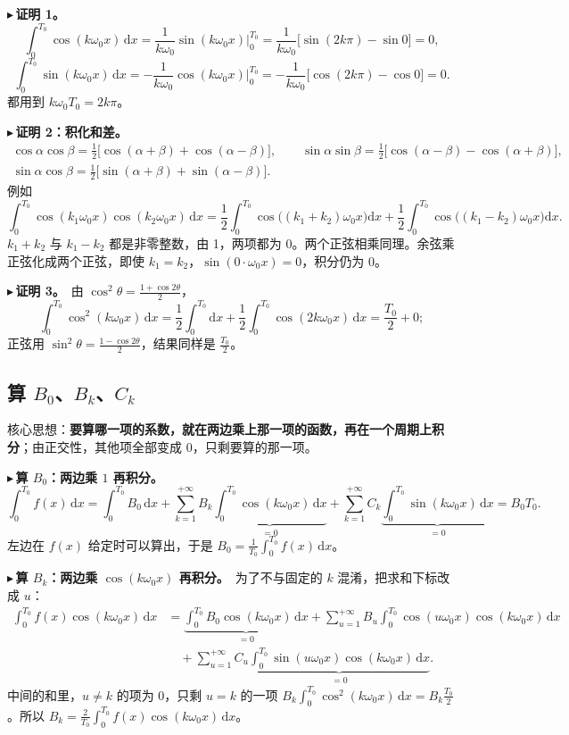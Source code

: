 \documentclass[UTF8,a4paper,11pt]{ctexart}
\newcounter{ex}[section]
\newcommand{\point}[1]{\par\addvspace{1ex}\noindent\textcolor{ptteal}{$\blacktriangleright$\,\textbf{#1}}\ }
\begin{document}
\point{证明 1。}
\[
\int_0^{T_0}\cos(k\omega_0x)\,\mathrm{d}x=\frac{1}{k\omega_0}\sin(k\omega_0x)\Big|_0^{T_0}=\frac{1}{k\omega_0}\big[\sin(2k\pi)-\sin0\big]=0,
\]
\[
\int_0^{T_0}\sin(k\omega_0x)\,\mathrm{d}x=-\frac{1}{k\omega_0}\cos(k\omega_0x)\Big|_0^{T_0}=-\frac{1}{k\omega_0}\big[\cos(2k\pi)-\cos0\big]=0 .
\]
都用到 $k\omega_0T_0=2k\pi$。

\point{证明 2：积化和差。}
\begin{gather*}
\cos\alpha\cos\beta=\tfrac12\big[\cos(\alpha+\beta)+\cos(\alpha-\beta)\big],\qquad
\sin\alpha\sin\beta=\tfrac12\big[\cos(\alpha-\beta)-\cos(\alpha+\beta)\big],\\
\sin\alpha\cos\beta=\tfrac12\big[\sin(\alpha+\beta)+\sin(\alpha-\beta)\big].
\end{gather*}
例如
\[
\int_0^{T_0}\cos(k_1\omega_0x)\cos(k_2\omega_0x)\,\mathrm{d}x
=\frac12\int_0^{T_0}\cos\big((k_1+k_2)\omega_0x\big)\mathrm{d}x+\frac12\int_0^{T_0}\cos\big((k_1-k_2)\omega_0x\big)\mathrm{d}x .
\]
$k_1+k_2$ 与 $k_1-k_2$ 都是非零整数，由 1，两项都为 $0$。两个正弦相乘同理。余弦乘正弦化成两个正弦，即使 $k_1=k_2$，$\sin(0\cdot\omega_0x)=0$，积分仍为 $0$。

\point{证明 3。}由 $\cos^2\theta=\frac{1+\cos2\theta}{2}$，
\[
\int_0^{T_0}\cos^2(k\omega_0x)\,\mathrm{d}x=\frac12\int_0^{T_0}\mathrm{d}x+\frac12\int_0^{T_0}\cos(2k\omega_0x)\,\mathrm{d}x=\frac{T_0}{2}+0 ;
\]
正弦用 $\sin^2\theta=\frac{1-\cos2\theta}{2}$，结果同样是 $\frac{T_0}{2}$。

\subsection{算 \texorpdfstring{$B_0$、$B_k$、$C_k$}{B0、Bk、Ck}}
核心思想：\textbf{要算哪一项的系数，就在两边乘上那一项的函数，再在一个周期上积分}；由正交性，其他项全部变成 $0$，只剩要算的那一项。

\point{算 $B_0$：两边乘 $1$ 再积分。}
\[
\int_0^{T_0}f(x)\,\mathrm{d}x=\int_0^{T_0}B_0\,\mathrm{d}x+\sum_{k=1}^{+\infty}B_k\underbrace{\int_0^{T_0}\cos(k\omega_0x)\,\mathrm{d}x}_{=0}+\sum_{k=1}^{+\infty}C_k\underbrace{\int_0^{T_0}\sin(k\omega_0x)\,\mathrm{d}x}_{=0}=B_0T_0 .
\]
左边在 $f(x)$ 给定时可以算出，于是 $B_0=\frac{1}{T_0}\int_0^{T_0}f(x)\,\mathrm{d}x$。

\point{算 $B_k$：两边乘 $\cos(k\omega_0x)$ 再积分。}为了不与固定的 $k$ 混淆，把求和下标改成 $u$：
\begin{align*}
\int_0^{T_0}f(x)\cos(k\omega_0x)\,\mathrm{d}x
&=\underbrace{\int_0^{T_0}B_0\cos(k\omega_0x)\,\mathrm{d}x}_{=0}
+\sum_{u=1}^{+\infty}B_u\int_0^{T_0}\cos(u\omega_0x)\cos(k\omega_0x)\,\mathrm{d}x\\
&\quad+\sum_{u=1}^{+\infty}C_u\underbrace{\int_0^{T_0}\sin(u\omega_0x)\cos(k\omega_0x)\,\mathrm{d}x}_{=0}.
\end{align*}
中间的和里，$u\ne k$ 的项为 $0$，只剩 $u=k$ 的一项 $B_k\int_0^{T_0}\cos^2(k\omega_0x)\,\mathrm{d}x=B_k\frac{T_0}{2}$。所以 $B_k=\frac{2}{T_0}\int_0^{T_0}f(x)\cos(k\omega_0x)\,\mathrm{d}x$。
\end{document}
